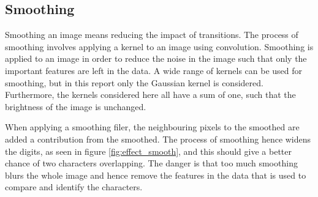 \subsection{Smoothing}\label{sec:smoothing}

Smoothing an image means reducing the impact of transitions.
The process of smoothing involves applying a kernel to an image using convolution.
Smoothing is applied to an image in order to reduce the noise in the image such that only the important features are left in the data.
A wide range of kernels can be used for smoothing, but in this report only the Gaussian kernel is considered.
Furthermore, the kernels considered here all have a sum of one, such that the brightness of the image is unchanged.

When applying a smoothing filer, the neighbouring pixels to the smoothed are added a contribution from the smoothed.
The process of smoothing hence widens the digits, as seen in figure \ref{fig:effect_smooth}, and this should give a better chance of two characters overlapping.
The danger is that too much smoothing blurs the whole image and hence remove the features in the data that is used to compare and identify the characters.


